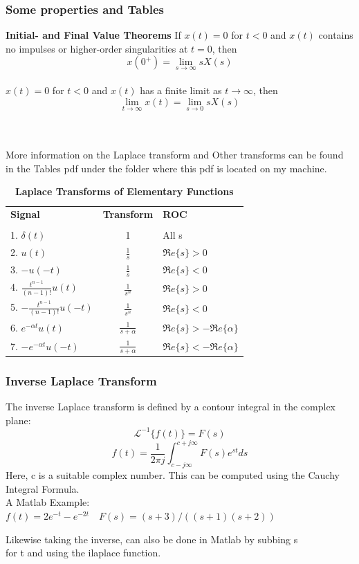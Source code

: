 \documentclass{beamer}
\newcommand{\R}{\mbox{$\Re e\{s\}$}}
\begin{document}
\begin{frame}[allowframebreaks]
\frametitle{Some properties and Tables}
\textbf{Initial- and Final Value Theorems}
If $x(t)=0$ for $ t < 0$ and $x(t)$ contains no impulses or higher-order singularities at $t=0$, then  \\
	$$x(0^+) = \lim_{s\to \infty} sX(s)$$ \\
 $x(t)=0$ for $ t<0$ and $x(t)$ has a finite limit as $ t\to \infty$, then \\
	$$\lim_{t\to\infty} x(t) = \lim_{s\to 0}sX(s)$$\\ \

More information on the Laplace transform and Other transforms can be found in the Tables pdf under the folder where this pdf is located on my machine.
\begin{table}[htbp]
	\begin{center}
		\begin{tabular}{l|c|l} 
			{\bf Signal} &{\bf Transform} &{\bf ROC} \\ %
			&&\\
			\hline 1. $\delta(t)$ &1 & All
			s \\
			2. $u(t)$ &$\displaystyle\frac{1}{s}$ &$\R > 0$ \\
			3. $-u(-t)$ &$\displaystyle\frac{1}{s}$ &$\R < 0$ \\
			4. $\displaystyle\frac{t^{n-1}}{(n-1)!}u(t)$
			&$\displaystyle\frac{1}{s^{n}}$ &$\R > 0$ \\
			5. $-\displaystyle\frac{t^{n-1}}{(n-1)!}u(-t)$
			&$\displaystyle\frac{1}{s^{n}}$ &$\R < 0$ \\
			6. $e^{-\alpha t}u(t)$ &$\displaystyle\frac{1}{s + \alpha}$
			&$\R > -\Re e \{ \alpha\} $  \\
			7. $-e^{-\alpha t}u(-t)$ &$\displaystyle\frac{1}{s +
				\alpha}$ &$\R < -\Re e \{ \alpha\} $ \\
		\end{tabular}
	\end{center}
	
\caption{\bf Laplace Transforms of Elementary
	Functions}
\end{table}
\end{frame}
\begin{frame}
\frametitle{Inverse Laplace Transform}
The inverse Laplace transform is defined by a contour integral in the complex plane:
$$\mathscr{L}^{-1}\{f(t)\}=F(s)$$
$$ f(t)=\frac{1}{2\pi j}\int_{c-j\infty}^{c+j\infty}F(s)e^{st}ds$$
Here, c is a suitable complex number. This can be computed using the Cauchy Integral Formula. \cite{wiki:Cauchy} \\
A Matlab Example: $f(t)=2e^{-t}-e^{-2t} \quad F(s)=(s+3)/((s+1)(s+2))$

Likewise taking the inverse, can also be done in Matlab by subbing s \\
for t and using the ilaplace function.
\end{frame}
\end{document}
